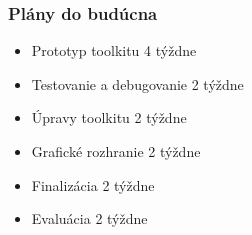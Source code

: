 \begin{frame}
  \frametitle{Plány do budúcna}
  \centering
      \begin{itemize}
        \item Prototyp toolkitu \hspace{62pt} 4 týždne
        \item Testovanie a debugovanie \hspace{12pt} 2 týždne
        \item Úpravy toolkitu \hspace{69pt} 2 týždne
        \item Grafické rozhranie \hspace{53pt} 2 týždne
        \item Finalizácia \hspace{91pt} 2 týždne
        \item Evaluácia \hspace{93pt} 2 týždne
      \end{itemize}
\end{frame}






